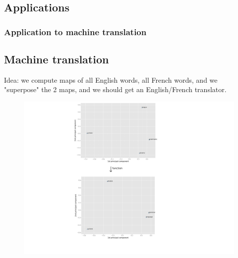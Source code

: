 \documentclass{beamer}
\begin{document}
\begin{frame}

\section{Applications}	

\frametitle{Application to machine translation}	
	
\subsection{Machine translation}	






Idea: we compute maps of all English words, all French words, and we "superpose" the 2 maps, and we should get an English/French translator.



\begin{figure}
\includegraphics[width=0.85\linewidth]{functionfrenchenglish.png}
\end{figure}



\end{frame}	
\end{document}
